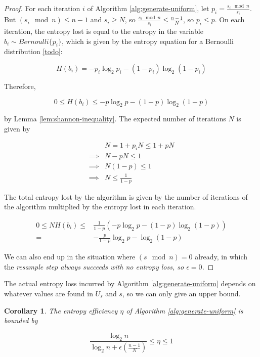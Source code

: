 \documentclass[12pt]{article}
\newtheorem{corollary}{Corollary}
\begin{document}
\begin{proof}
For each iteration $i$ of Algorithm \ref{alg:generate-uniform}, let $p_i = \frac{s_i \mod n}{s_i}$. But $(s_i \mod n) \le n-1$ and $s_i \ge N$, so $\frac{s_i \mod n}{s_i} \le \frac{n-1}{N}$, so $p_i \le p$. On each iteration, the entropy lost is equal to the entropy in the variable $b_i \sim Bernoulli\{p_i\}$, which is given by the entropy equation for a Bernoulli distribution \ref{todo}:

\begin{equation}
H(b_i) = -p_i\log_2p_i - (1-p_i)\log_2(1-p_i)
\end{equation}

Therefore, 

\begin{equation}
0 \le H(b_i) \le -p\log_2p - (1-p)\log_2(1-p) 
\end{equation}


by Lemma \ref{lem:shannon-inequality}. The expected number of iterations $N$ is given by

\begin{align}
& N = 1 + p_iN \le 1 + pN \\
\implies & N-pN \le 1 \\
\implies & N(1-p) \le 1 \\
\implies & N \le \frac{1}{1-p}
\end{align}

The total entropy lost by the algorithm is given by the number of iterations of the algorithm multiplied by the entropy lost in each iteration.

\begin{align}
0 \le NH(b_i) \le & \frac{1}{1-p}(-p\log_2p - (1-p)\log_2(1-p) ) \\
= & -\frac{p}{1-p}\log_2p - \log_2(1-p)
\end{align}

We can also end up in the situation where $(s \mod n) = 0$ already, in which the \em resample \em step always succeeds with no entropy loss, so $\epsilon=0$.
\end{proof}

The actual entropy loss incurred by Algorithm \ref{alg:generate-uniform} depends on whatever values are found in $U_s$ and $s$, so we can only give an upper bound.

\begin{corollary}
The entropy efficiency $\eta$ of Algorithm \ref{alg:generate-uniform} is bounded by

\begin{equation}
\frac{\log_2n}{\log_2n + \epsilon(\frac{n-1}{N})} \le \eta \le 1
\label{eq:generate-uniform-efficiency}
\end{equation}
\end{corollary}
\end{document}
